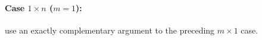 \paragraph{Case $1\times n$ ($m=1$):}
use an exactly complementary argument to the preceding \(m\times1\) case.



